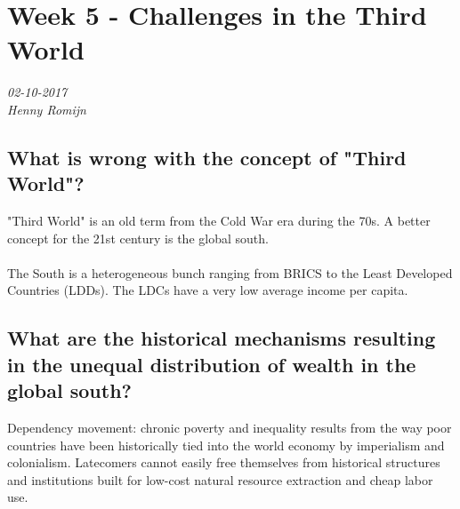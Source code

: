 \chapter{Week 5 - Challenges in the Third World}
\textit{02-10-2017 \\
Henny Romijn}

\section{What is wrong with the concept of "Third World"?}
"Third World" is an old term from the Cold War era during the 70s. A better concept for the 21st century is the global south. \\
\\
The South is a heterogeneous bunch ranging from BRICS to the Least Developed Countries (LDDs). The LDCs have a very low average income per capita.

\section{What are the historical mechanisms resulting in the unequal distribution of wealth in the global south?}
Dependency movement: chronic poverty and inequality results from the way poor countries have been historically tied into the world economy by imperialism and colonialism. Latecomers cannot easily free themselves from historical structures and institutions built for low-cost natural resource extraction and cheap labor use.

